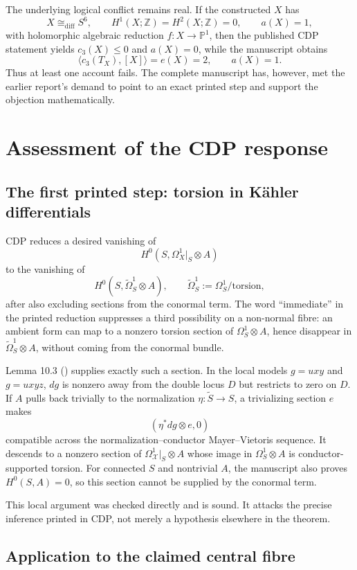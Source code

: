 \documentclass[11pt]{article}
\newcommand{\fileline}[1]{\path{#1}}
\newcommand{\Z}{\mathbb Z}
\newcommand{\PP}{\mathbb P}
\begin{document}
The underlying logical conflict remains real. If the constructed $X$ has
\[
X\cong_{\mathrm{diff}}S^6,\qquad H^1(X;\Z)=H^2(X;\Z)=0,\qquad a(X)=1,
\]
with holomorphic algebraic reduction $f:X\to\PP^1$, then the published CDP statement yields $c_3(X)\leq0$ and $a(X)=0$, while the manuscript obtains
\[
\langle c_3(T_X),[X]\rangle=e(X)=2,\qquad a(X)=1.
\]
Thus at least one account fails. The complete manuscript has, however, met the earlier report's demand to point to an exact printed step and support the objection mathematically.

\section{Assessment of the CDP response}

\subsection{The first printed step: torsion in K\"ahler differentials}

CDP reduces a desired vanishing of
\[
H^0(S,\Omega_X^1|_S\otimes A)
\]
to the vanishing of
\[
H^0(S,\widetilde\Omega_S^1\otimes A),\qquad
\widetilde\Omega_S^1:=\Omega_S^1/\text{torsion},
\]
after also excluding sections from the conormal term. The word ``immediate'' in the printed reduction suppresses a third possibility on a non-normal fibre: an ambient form can map to a nonzero torsion section of $\Omega_S^1\otimes A$, hence disappear in $\widetilde\Omega_S^1\otimes A$, without coming from the conormal bundle.

Lemma 10.3 (\fileline{parts/packet_08_body.tex:434}) supplies exactly such a section. In the local models $g=u x y$ and $g=u x y z$, $dg$ is nonzero away from the double locus $D$ but restricts to zero on $D$. If $A$ pulls back trivially to the normalization $\eta:\widetilde S\to S$, a trivializing section $e$ makes
\[
(\eta^*dg\otimes e,0)
\]
compatible across the normalization--conductor Mayer--Vietoris sequence. It descends to a nonzero section of $\Omega_{\mathcal X}^1|_S\otimes A$ whose image in $\Omega_S^1\otimes A$ is conductor-supported torsion. For connected $S$ and nontrivial $A$, the manuscript also proves $H^0(S,A)=0$, so this section cannot be supplied by the conormal term.

This local argument was checked directly and is sound. It attacks the precise inference printed in CDP, not merely a hypothesis elsewhere in the theorem.

\subsection{Application to the claimed central fibre}
\end{document}
